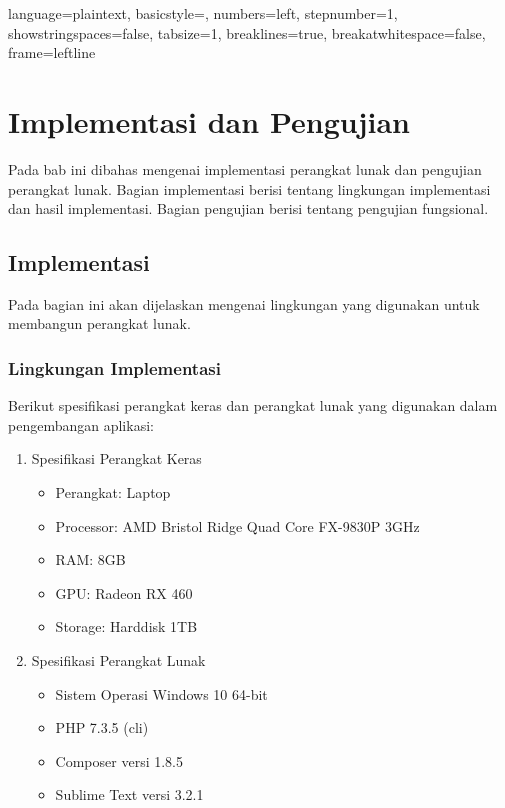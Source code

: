 
\lstset
{ 
    language=plaintext,
    basicstyle=\footnotesize,
    numbers=left,
    stepnumber=1,
    showstringspaces=false,
    tabsize=1,
    breaklines=true,
    breakatwhitespace=false,
    frame=leftline
}

\chapter{Implementasi dan Pengujian}
\label{chap:implementasiDanPengujian}

Pada bab ini dibahas mengenai implementasi perangkat lunak dan pengujian perangkat lunak. Bagian implementasi berisi tentang lingkungan implementasi dan hasil implementasi. Bagian pengujian berisi tentang pengujian fungsional.

\section{Implementasi}
Pada bagian ini akan dijelaskan mengenai lingkungan yang digunakan untuk membangun perangkat lunak.

\subsection{Lingkungan Implementasi}
Berikut spesifikasi perangkat keras dan perangkat lunak yang digunakan dalam pengembangan aplikasi:

\begin{enumerate}
	\item Spesifikasi Perangkat Keras
	
		\begin{itemize}
			\item Perangkat: Laptop
			\item Processor: AMD Bristol Ridge Quad Core FX-9830P 3GHz
			\item RAM: 8GB
			\item GPU: Radeon RX 460
			\item Storage: Harddisk 1TB
		\end{itemize}		

	\item Spesifikasi Perangkat Lunak

		\begin{itemize}
			\item Sistem Operasi Windows 10 64-bit
			\item PHP 7.3.5 (cli)
			\item Composer versi 1.8.5
			\item Sublime Text versi 3.2.1
		\end{itemize}	
	
\end{enumerate}

